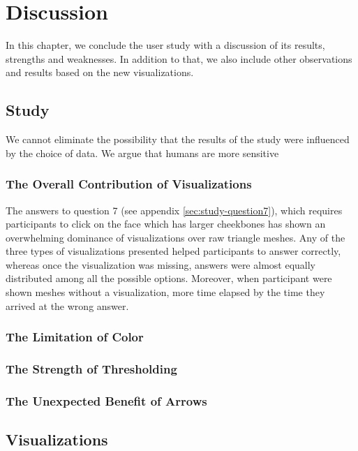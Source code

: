 \chapter{Discussion}

In this chapter, we conclude the user study with a discussion of its results, strengths and weaknesses. In addition to that, we also include other observations and results based on the new visualizations.

\section{Study}

We cannot eliminate the possibility that the results of the study were influenced by the choice of data. We argue that humans are more sensitive 

\subsection{The Overall Contribution of Visualizations}

The answers to question 7 (see appendix \ref{sec:study-question7}), which requires participants to click on the face which has larger cheekbones has shown an overwhelming dominance of visualizations over raw triangle meshes. Any of the three types of visualizations presented helped participants to answer correctly, whereas once the visualization was missing, answers were almost equally distributed among all the possible options. Moreover, when participant were shown meshes without a visualization, more time elapsed by the time they arrived at the wrong answer.

\subsection{The Limitation of Color}

\subsection{The Strength of Thresholding}

\subsection{The Unexpected Benefit of Arrows}

\section{Visualizations}